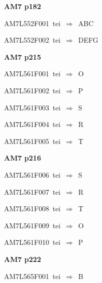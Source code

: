 \par\vfill\eject
{\bf\hfill AM7 p182\hfill\hbox{}}\par\bigskip
{\sixrm AM7L552F001\ {\sixit tei}\ }$\Rightarrow$\ ABC\par\smallskip
{\sixrm AM7L552F002\ {\sixit tei}\ }$\Rightarrow$\ DEFG\par\smallskip

\par\vfill\eject
{\bf\hfill AM7 p215\hfill\hbox{}}\par\bigskip
{\sixrm AM7L561F001\ {\sixit tei}\ }$\Rightarrow$\ O\par\smallskip
{\sixrm AM7L561F002\ {\sixit tei}\ }$\Rightarrow$\ P\par\smallskip
{\sixrm AM7L561F003\ {\sixit tei}\ }$\Rightarrow$\ S\par\smallskip
{\sixrm AM7L561F004\ {\sixit tei}\ }$\Rightarrow$\ R\par\smallskip
{\sixrm AM7L561F005\ {\sixit tei}\ }$\Rightarrow$\ T\par\smallskip

\par\vfill\eject
{\bf\hfill AM7 p216\hfill\hbox{}}\par\bigskip
{\sixrm AM7L561F006\ {\sixit tei}\ }$\Rightarrow$\ S\par\smallskip
{\sixrm AM7L561F007\ {\sixit tei}\ }$\Rightarrow$\ R\par\smallskip
{\sixrm AM7L561F008\ {\sixit tei}\ }$\Rightarrow$\ T\par\smallskip
{\sixrm AM7L561F009\ {\sixit tei}\ }$\Rightarrow$\ O\par\smallskip
{\sixrm AM7L561F010\ {\sixit tei}\ }$\Rightarrow$\ P\par\smallskip

\par\vfill\eject
{\bf\hfill AM7 p222\hfill\hbox{}}\par\bigskip
{\sixrm AM7L565F001\ {\sixit tei}\ }$\Rightarrow$\ B\par\smallskip

